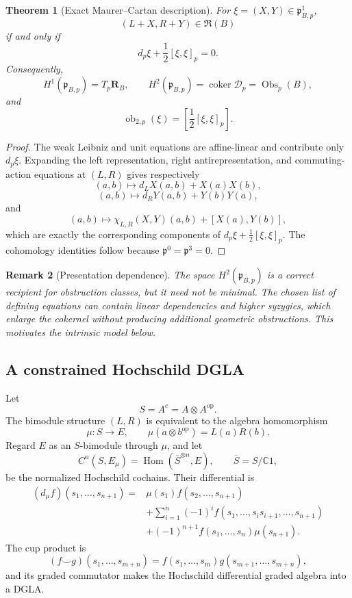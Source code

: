 \documentclass[11pt]{amsart}
\newtheorem{theorem}{Theorem}[section]
\newtheorem{remark}[theorem]{Remark}
\newcommand{\Hom}{\operatorname{Hom}}
\newcommand{\coker}{\operatorname{coker}}
\newcommand{\Obs}{\operatorname{Obs}}
\newcommand{\Rfib}{\mathfrak R}
\newcommand{\cD}{\mathscr D}
\newcommand{\C}{\mathbb C}
\newcommand{\gpres}{\mathfrak p}
\begin{document}
\begin{theorem}[Exact Maurer--Cartan description]\label{thm:presentation-mc}
For $\xi=(X,Y)\in\gpres_{B,p}^{1}$,
\[
(L+X,R+Y)\in\Rfib(B)
\]
if and only if
\[
d_p\xi+\frac12[\xi,\xi]_p=0.
\]
Consequently,
\[
H^1(\gpres_{B,p})=T_p\mathbf R_B,
\qquad
H^2(\gpres_{B,p})=\coker\cD_p=\Obs_p(B),
\]
and
\[
\operatorname{ob}_{2,p}(\xi)
=
\left[\frac12[\xi,\xi]_p\right].
\]
\end{theorem}

\begin{proof}
The weak Leibniz and unit equations are affine-linear and contribute only $d_p\xi$.  Expanding the left representation, right antirepresentation, and commuting-action equations at $(L,R)$ gives respectively
\[
(a,b)\longmapsto d_LX(a,b)+X(a)X(b),
\]
\[
(a,b)\longmapsto d_RY(a,b)+Y(b)Y(a),
\]
and
\[
(a,b)\longmapsto\chi_{L,R}(X,Y)(a,b)+[X(a),Y(b)],
\]
which are exactly the corresponding components of $d_p\xi+\tfrac12[\xi,\xi]_p$.  The cohomology identities follow because $\gpres^0=\gpres^3=0$.
\end{proof}

\begin{remark}[Presentation dependence]
The space $H^2(\gpres_{B,p})$ is a correct recipient for obstruction classes, but it need not be minimal.  The chosen list of defining equations can contain linear dependencies and higher syzygies, which enlarge the cokernel without producing additional geometric obstructions.  This motivates the intrinsic model below.
\end{remark}

\subsection{A constrained Hochschild DGLA}

Let
\[
S=A^e=A\otimes A^{\mathrm{op}}.
\]
The bimodule structure $(L,R)$ is equivalent to the algebra homomorphism
\[
\mu:S\longrightarrow E,
\qquad
\mu(a\otimes b^{\mathrm{op}})=L(a)R(b).
\]
Regard $E$ as an $S$-bimodule through $\mu$, and let
\[
C^n(S,E_\mu)=\Hom(\overline{S}^{\otimes n},E),
\qquad
\overline S=S/\C1,
\]
be the normalized Hochschild cochains.  Their differential is
\begin{align*}
(d_\mu f)(s_1,\ldots,s_{n+1})
={}&\mu(s_1)f(s_2,\ldots,s_{n+1})\\
&+\sum_{i=1}^{n}(-1)^if(s_1,\ldots,s_is_{i+1},\ldots,s_{n+1})\\
&+(-1)^{n+1}f(s_1,\ldots,s_n)\mu(s_{n+1}).
\end{align*}
The cup product is
\[
(f\smile g)(s_1,\ldots,s_{m+n})
=f(s_1,\ldots,s_m)g(s_{m+1},\ldots,s_{m+n}),
\]
and its graded commutator makes the Hochschild differential graded algebra into a DGLA.
\end{document}
